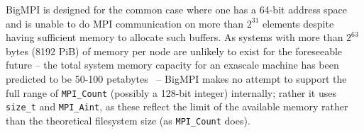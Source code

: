 BigMPI is designed for the common case where one has a 64-bit address
space and is unable to do MPI communication on more than $2^{31}$ elements
despite having sufficient memory to allocate such buffers.
As systems with more than $2^{63}$ bytes (8192 PiB) of memory 
per node are unlikely to exist for the foreseeable future --
the total system memory capacity for an exascale machine has been 
predicted to be 50-100 petabytes~\cite{shalf2011exascale} --
BigMPI makes no attempt to support the full range of \texttt{MPI\_Count}
(possibly a 128-bit integer) internally; rather it uses \texttt{size\_t}
and \texttt{MPI\_Aint}, as these reflect the limit of the available memory
rather than the theoretical filesystem size (as \texttt{MPI\_Count} does).